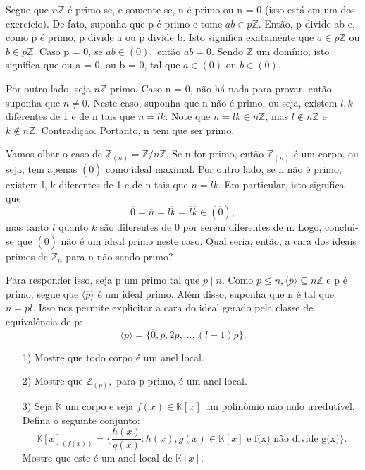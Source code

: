 \documentclass[AlgebraII/algebraII_notes.tex]{subfiles}
\begin{document}
\begin{example}
	Segue que \(n \mathbb{Z}\) é primo se, e somente se, n é primo ou n = 0 (isso está em um dos exercício).
	De fato, suponha que p é primo e tome \(ab\in p \mathbb{Z}.\) Então, p divide ab e, como p é primo, p divide a ou p divide b.
	Isto significa exatamente que \(a\in p\mathbb{Z}\) ou \(b\in p \mathbb{Z}.\) Caso p = 0, se \(ab\in (0),\) então
	\(ab=0\). Sendo \(\mathbb{Z}\) um domínio, isto significa que ou a = 0, ou b = 0, tal que \(a\in (0)\) ou \(b\in (0)\).

	Por outro lado, seja \(n \mathbb{Z}\) primo. Caso  n = 0, não há nada para provar, então suponha que \(n\neq 0\).
	Neste caso, suponha que n não é primo, ou seja, existem \(l, k\) diferentes de 1 e de n tais que \(n = lk\). Note que
	\(n = lk\in n\mathbb{Z}\), mas \(l\not\in n \mathbb{Z}\) e \(k\not\in n \mathbb{Z}.\) Contradição. Portanto, n tem que ser primo.
\end{example}
\begin{example}
	Vamos olhar o caso de \(\mathbb{Z}_{(n)} = \mathbb{Z}/n \mathbb{Z}.\) Se n for primo, então \(\mathbb{Z}_{(n)}\) é um corpo, ou seja, tem apenas \((\overline{0})\) como
	ideal maximal. Por outro lado, se n não é primo, existem l, k diferentes de 1 e de n tais que \(n = lk\). Em particular, isto significa que
	\[
		\overline{0} = \overline{n} = \overline{lk} = \overline{l}\overline{k}\in (\overline{0}),
	\]
	mas tanto \(\overline{l}\) quanto \(\overline{k}\) são diferentes de \(\overline{0}\) por serem diferentes de n. Logo, conclui-se que \((\overline{0})\) não é
	um ideal primo neste caso. Qual seria, então, a cara dos ideais primos de \(\mathbb{Z}_{n}\) para n não sendo primo?

	Para responder isso, seja p um primo tal que \(p\mid n\). Como \(p\leq n, \langle \overline{p} \rangle\subseteq n \mathbb{Z}\) e p é primo, segue que
	\(\langle \overline{p} \rangle\) é um ideal primo. Além disso, suponha que n é tal que \(n = pl\). Isso nos permite explicitar a cara do ideal gerado pela classe
	de equivalência de p:
	\[
		\langle \overline{p} \rangle = \{\overline{0}, \overline{p}, 2\overline{p}, \dotsc , (l-1)\overline{p}\}.
	\]
\end{example}
\begin{example}[Exercício]
	\begin{itemize}
		\item[1)] Mostre que todo corpo é um anel local.
		\item[2)] Mostre que \(\mathbb{Z}_{(p)},\) para p primo, é um anel local.
		\item[3)] Seja \(\mathbb{K}\) um corpo e seja \(f(x)\in \mathbb{K}[x]\) um polinômio não nulo irredutível.
		      Defina o seguinte conjunto:
		      \[
			      \mathbb{K}[x]_{(f(x))} = \biggl\{\frac{h(x)}{g(x)}: h(x), g(x)\in \mathbb{K}[x] \text{ e f(x) não divide g(x)}\biggr\}.
		      \]
		      Mostre que este é um anel local de \(\mathbb{K}[x].\)
	\end{itemize}
\end{example}
\end{document}
